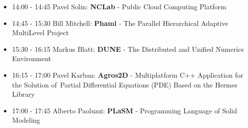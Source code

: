 \documentclass[10pt]{article}%
\begin{document}
\begin{itemize}
  \begin{itemize}
    \item 14:00 - 14:45 Pavel Solin: {\bf NCLab} - Public Cloud Computing Platform
    \item 14:45 - 15:30 Bill Mitchell: {\bf Phaml} - The Parallel Hierarchical Adaptive MultiLevel Project
    \item 15:30 - 16:15 Markus Blatt: {\bf DUNE} - The Distributed and Unified Numerics Environment
    \item 16:15 - 17:00 Pavel Karban: {\bf Agros2D} - Multiplatform C++ Application for the Solution of~Partial Differential Equations (PDE) Based on the Hermes Library  
    \item 17:00 - 17:45 Alberto Paoluzzi: {\bf PLaSM} - Programming Language of Solid Modeling
  \end{itemize}
\end{itemize}
\end{document}
